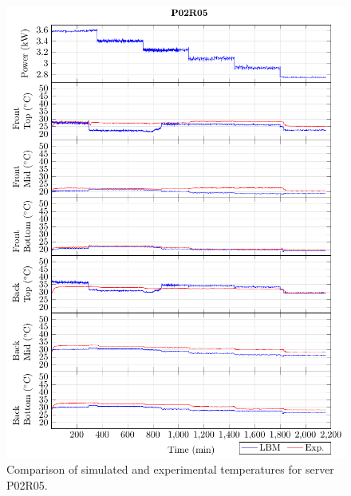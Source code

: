 \documentclass[border=10pt,preview]{standalone}
\begin{document}
\begin{figure}[!htb]
\centering
\includegraphics[width=\linewidth]{Plots/P02R05_T.pdf}
\caption{Comparison of simulated and experimental temperatures for server P02R05.}
\label{fig:P02R05_plot}
\end{figure}

\clearpage
\end{document}

